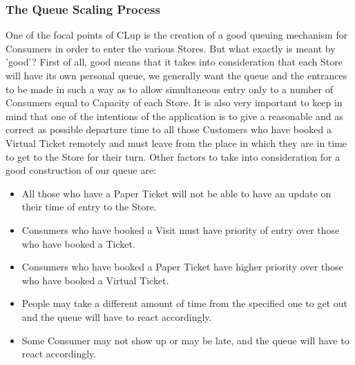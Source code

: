 \documentclass[a4paper, 12pt, oneside, table]{article}
\begin{document}
\subsubsection{The Queue Scaling Process}
One of the focal points of CLup is the creation of a good queuing mechanism for Consumers in order to enter the various Stores. But what exactly is meant by 'good'? First of all, good means that it takes into consideration that each Store will have its own personal queue, we generally want the queue and the entrances to be made in such a way as to allow simultaneous entry only to a number of Consumers equal to Capacity of each Store. It is also very important to keep in mind that one of the intentions of the application is to give a reasonable and as correct as possible departure time to all those Customers who have booked a Virtual Ticket remotely and must leave from the place in which they are in time to get to the Store for their turn. Other factors to take into consideration for a good construction of our queue are:
\begin{itemize}
\item All those who have a Paper Ticket will not be able to have an update on their time of entry to the Store.
\item Consumers who have booked a Visit must have priority of entry over those who have booked a Ticket.
\item Consumers who have booked a Paper Ticket have higher priority over those who have booked a Virtual Ticket.
\item People may take a different amount of time from the specified one to get out and the queue will have to react accordingly.
\item Some Consumer may not show up or may be late, and the queue will have to react accordingly.
\end{itemize}
\end{document}
